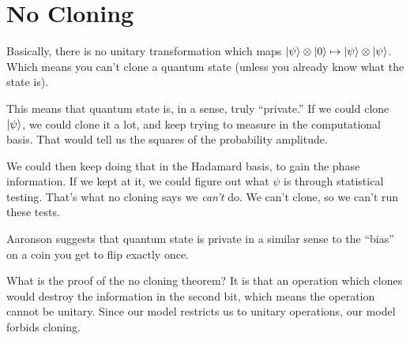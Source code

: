 \section{No Cloning}

\begin{remark}
  Basically, there is no unitary transformation which maps
  $|\psi\rangle \otimes |0\rangle \mapsto |\psi\rangle \otimes
  |\psi\rangle$. Which means you can't clone a quantum state (unless
  you already know what the state is).

  This means that quantum state is, in a sense, truly ``private.'' If we
  could clone $|\psi\rangle$, we could clone it a lot, and keep trying
  to measure in the computational basis. That would tell us the squares
  of the probability amplitude.

  We could then keep doing that in the Hadamard basis, to gain the phase
  information. If we kept at it, we could figure out what $\psi$ is
  through statistical testing. That's what no cloning says we
  \emph{can't} do. We can't clone, so we can't run these tests.

  Aaronson suggests that quantum state is private in a similar sense to
  the ``bias'' on a coin you get to flip exactly once.
\end{remark}

\begin{remark}
  What is the proof of the no cloning theorem? It is that an operation
  which clones would destroy the information in the second bit, which
  means the operation cannot be unitary. Since our model restricts us to
  unitary operations, our model forbids cloning.
\end{remark}
